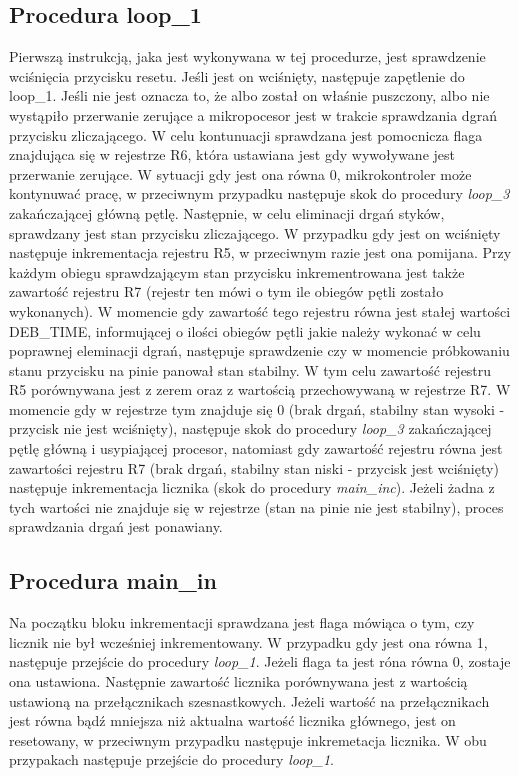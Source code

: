 \documentclass[fleqn]{article}
\begin{document}
\subsection{Procedura loop\_1}
		Pierwszą instrukcją, jaka jest wykonywana w tej procedurze, jest sprawdzenie wciśnięcia przycisku resetu. Jeśli jest on wciśnięty, następuje zapętlenie do loop\_1. Jeśli nie jest oznacza to, że albo został on właśnie puszczony, albo nie wystąpiło przerwanie zerujące a mikropocesor jest w trakcie sprawdzania dgrań przycisku zliczającego. W celu kontunuacji sprawdzana jest pomocnicza flaga znajdująca się w rejestrze R6, która ustawiana jest gdy wywoływane jest przerwanie zerujące. W sytuacji gdy jest ona równa 0, mikrokontroler może kontynuwać pracę, w przeciwnym przypadku następuje skok do procedury \textit{loop\_3} zakańczającej główną pętlę. Następnie, w celu eliminacji drgań styków, sprawdzany jest stan przycisku zliczającego. W przypadku gdy jest on wciśnięty następuje inkrementacja rejestru R5, w przeciwnym razie jest ona pomijana. Przy każdym obiegu sprawdzającym stan przycisku inkrementrowana jest także zawartość rejestru R7 (rejestr ten mówi o tym ile obiegów pętli zostało wykonanych). W momencie gdy zawartość tego rejestru równa jest stałej wartości DEB_TIME, informującej o ilości obiegów pętli jakie należy wykonać w celu poprawnej eleminacji dgrań, następuje sprawdzenie czy w momencie próbkowaniu stanu przycisku na pinie panował stan stabilny. W tym celu zawartość rejestru R5 porównywana jest z zerem oraz z wartością przechowywaną w rejestrze R7. W momencie gdy w rejestrze tym znajduje się 0 (brak drgań, stabilny stan wysoki - przycisk nie jest wciśnięty), następuje skok do procedury \textit{loop\_3} zakańczającej pętlę główną i usypiającej procesor, natomiast gdy zawartość rejestru równa jest zawartości rejestru R7 (brak drgań, stabilny stan niski - przycisk jest wciśnięty) następuje inkrementacja licznika (skok do procedury \textit{main\_inc}). Jeżeli żadna z tych wartości nie znajduje się w rejestrze (stan na pinie nie jest stabilny), proces sprawdzania drgań jest ponawiany. 

\subsection{Procedura main\_in}
Na początku bloku inkrementacji sprawdzana jest flaga mówiąca o tym, czy licznik nie był wcześniej inkrementowany. W przypadku gdy jest ona równa 1, następuje przejście do procedury \textit{loop\_1}. Jeżeli flaga ta jest róna równa 0, zostaje ona ustawiona. Następnie zawartość licznika porównywana jest z wartością ustawioną na przełącznikach szesnastkowych. Jeżeli wartość na przełącznikach jest równa bądź mniejsza niż aktualna wartość licznika głównego, jest on resetowany, w przeciwnym przypadku następuje inkremetacja licznika. W obu przypakach następuje przejście do procedury \textit{loop\_1}.
\end{document}
